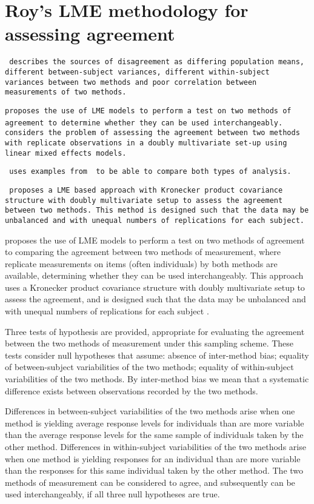 \documentclass[12pt, a4paper]{report}
\theoremstyle{plain}
\theoremstyle{definition}
\theoremstyle{remark}
\begin{document}
\section{Roy's LME methodology for assessing agreement}
\texttt{\citet{Barnhart}  describes the sources of disagreement as
	differing population means, different between-subject variances,
	different within-subject variances between two methods and poor
	correlation between measurements of two methods.	}

\texttt{\citet{ARoy2009}proposes the use of LME models to perform a test
	on two methods of agreement to determine whether they can be used
	interchangeably.	}
\texttt{ \citet{ARoy2009} considers the problem of assessing the agreement
	between two methods with replicate observations in a doubly
	multivariate set-up using linear mixed effects models.}


\texttt{\citet{ARoy2009} uses examples from \citet{BA86} to be able to
	compare both types of analysis.}

\texttt{\citet{ARoy2009} proposes a LME based approach with Kronecker
	product covariance structure with doubly multivariate setup to
	assess the agreement between two methods. This method is designed
	such that the data may be unbalanced and with unequal numbers of
	replications for each subject.}


\newpage


\citet{ARoy2009} proposes the use of LME models to perform a test on two methods of agreement to comparing the agreement between two methods of measurement, where replicate measurements on items (often individuals) by both methods are available, determining whether they can be used
interchangeably. This approach uses a Kronecker product covariance structure with doubly multivariate setup to
assess the agreement, and is designed such that the data may be unbalanced and with unequal numbers of replications for each subject \citep{ARoy2009}.

Three tests of hypothesis are provided, appropriate for evaluating the agreement between the two methods of measurement under this sampling scheme. These tests consider null hypotheses that assume: absence of inter-method bias; equality of between-subject variabilities of the two methods; equality of within-subject variabilities of the two methods. By inter-method bias we mean that a systematic difference exists between observations recorded by the two methods. 

Differences in between-subject variabilities of the two methods arise when one method is yielding average response levels for individuals than are more variable than the average response levels for the same sample of individuals taken by the other method.  Differences in within-subject variabilities of the two methods arise when one method is yielding responses for an individual than are more variable than the responses for this same individual taken by the other method. The two methods of measurement can be considered to agree, and subsequently can be used interchangeably, if all three null hypotheses are true.	
\end{document}
